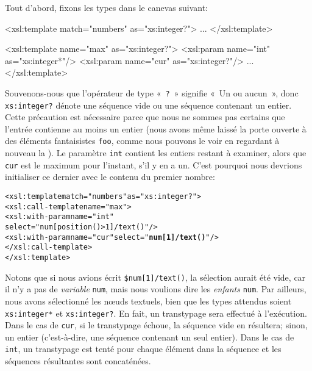 \noindent Tout d'abord, fixons les types dans le canevas suivant:
\begin{sverb}
  <xsl:template match="numbers" as="xs:integer?">
    ...
  </xsl:template>

  <xsl:template name="max" as="xs:integer?">
    <xsl:param name="int" as="xs:integer*"/>
    <xsl:param name="cur" as="xs:integer?"/>
    ...
  </xsl:template>
\end{sverb}
Souvenons-nous que l'opérateur de type «~\texttt{?}~» signifie «~Un ou
aucun~», donc \texttt{xs:integer?} dénote une séquence vide ou une
séquence contenant un entier. Cette précaution est nécessaire parce
que nous ne sommes pas certains que l'entrée contienne au moins un
entier (nous avons même laissé la porte ouverte à des éléments
fantaisistes \texttt{foo}, comme nous pouvons le voir en regardant à
nouveau la \DTD). Le paramètre \texttt{int} contient les entiers
restant à examiner, alors que \texttt{cur} est le maximum pour
l'instant, s'il y en a un. C'est pourquoi nous devrions initialiser ce
dernier avec le contenu du premier nombre:
\begin{alltt}
\small  <xsl:template match="numbers" as="xs:integer?">
    <xsl:call-template name="max">
      <xsl:with-param name="int"
                      select="num[position()>1]/text()"/>
      <xsl:with-param name="cur" select="\textbf{num[1]/text()}"/>
    </xsl:call-template>
  </xsl:template>
\end{alltt}
Notons que si nous avions écrit \texttt{\$num[1]/text()}, la sélection
aurait été vide, car il n'y a pas de \emph{variable} \texttt{num},
mais nous voulions dire les \emph{enfants} \texttt{num}. Par ailleurs,
nous avons sélectionné les nœuds textuels, bien que les types
attendus soient \texttt{xs:integer*} et \texttt{xs:integer?}. En fait,
un transtypage sera effectué à l'exécution. Dans le cas de
\texttt{cur}, si le transtypage échoue, la séquence vide en résultera;
sinon, un entier (c'est-à-dire, une séquence contenant un seul
entier). Dans le cas de \texttt{int}, un transtypage est tenté pour
chaque élément dans la séquence et les séquences résultantes sont
concaténées.

